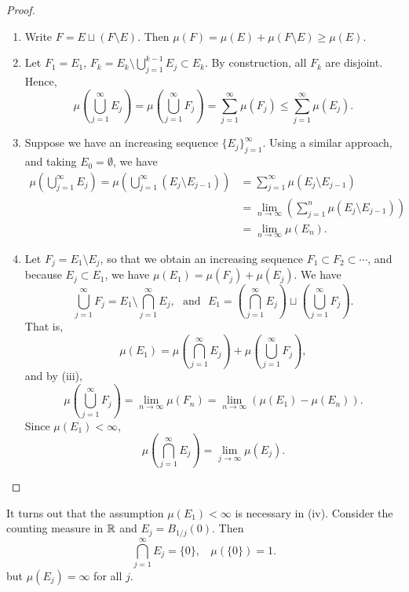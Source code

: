 \documentclass[12pt]{article} %
\begin{document}
\begin{proof}
    \begin{enumerate}
        \item Write $F = E \sqcup (F \setminus E)$. Then $\mu(F) = \mu(E) + \mu(F \setminus E) \geq \mu(E)$.
        \item Let $F_1 = E_1$, $F_k = E_k \setminus \bigcup_{j=1}^{k-1} E_j \subset E_k$. By construction, all $F_k$ are disjoint. Hence, \[\mu\left(\bigcup_{j=1}^{\infty} E_j \right) = \mu\left(\bigcup_{j=1}^{\infty} F_j \right) = \sum_{j=1}^{\infty} \mu(F_j) \leq \sum_{j=1}^{\infty} \mu(E_j).\]
        \item Suppose we have an increasing sequence $\{E_j\}_{j=1}^{\infty}$. Using a similar approach, and taking $E_0 = \emptyset$, we have \begin{align*}
            \mu\left(\bigcup_{j=1}^{\infty} E_j \right) = \mu\left(\bigcup_{j=1}^{\infty}\left(E_j \setminus E_{j-1}\right) \right) &= \sum_{j=1}^{\infty} \mu(E_j \setminus E_{j-1}) \\
            &= \lim_{n \to \infty} \left(\sum_{j=1}^{n} \mu(E_j \setminus E_{j-1})\right)\\
            &= \lim_{n\to \infty} \mu(E_n).
        \end{align*}
        \item Let $F_j = E_1 \setminus E_j$, so that we obtain an increasing sequence $F_1 \subset F_2 \subset \cdots$, and because $E_j \subset E_1$, we have $\mu(E_1) = \mu(F_j) + \mu(E_j)$. We have \[\bigcup_{j=1}^{\infty} F_j = E_1 \setminus \bigcap_{j=1}^{\infty} E_j, \ \ \ \text{and} \ \ \ E_1 = \left(\bigcap_{j=1}^{\infty} E_j\right) \sqcup \left(\bigcup_{j=1}^{\infty} F_j\right).\] That is, \[\mu(E_1) = \mu\left(\bigcap_{j=1}^{\infty} E_j \right) + \mu\left(\bigcup_{j=1}^{\infty} F_j \right),\] and by (iii), \[\mu\left(\bigcup_{j=1}^{\infty} F_j \right) = \lim_{n\to \infty} \mu(F_n) = \lim_{n \to 
        \infty} (\mu(E_1) - \mu(E_n)).\] Since $\mu(E_1) < \infty$, \[\mu\left(\bigcap_{j=1}^{\infty} E_j \right) = \lim_{j\to \infty} \mu(E_j).\]
    \end{enumerate}
\end{proof}

\begin{remark}
    It turns out that the assumption $\mu(E_1) < \infty$ is necessary in (iv). Consider the counting measure in $\mathbb{R}$ and $E_j = B_{1/j}(0)$. Then \[\bigcap_{j=1}^{\infty} E_j = \{0\}, \ \ \ \ \mu(\{0\}) = 1.\] but $\mu(E_j) = \infty$ for all $j$.
\end{remark}
\end{document}

